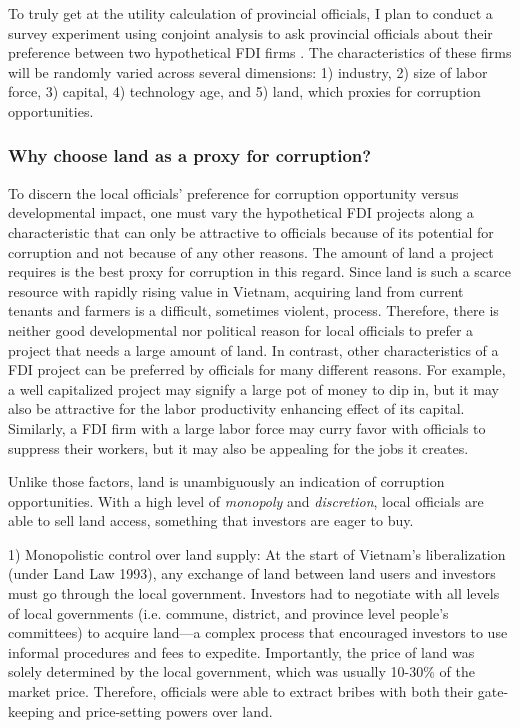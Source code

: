 To truly get at the utility calculation of provincial officials, I plan to conduct a survey experiment using conjoint analysis to ask provincial officials about their preference between two hypothetical FDI firms \citep{Hainmueller2014}. The characteristics of these firms will be randomly varied across several dimensions: 1) industry, 2) size of labor force, 3) capital, 4) technology age, and 5) land, which proxies for corruption opportunities.

\subsubsection{Why choose land as a proxy for corruption?}

To discern the local officials' preference for corruption opportunity versus developmental impact, one must vary the hypothetical FDI projects along a characteristic that can only be attractive to officials because of its potential for corruption and not because of any other reasons. The amount of land a project requires is the best proxy for corruption in this regard. Since land is such a scarce resource with rapidly rising value in Vietnam, acquiring land from current tenants and farmers is a difficult, sometimes violent, process. Therefore, there is neither good developmental nor political reason for local officials to prefer a project that needs a large amount of land. In contrast, other characteristics of a FDI project can be preferred by officials for many different reasons. For example, a well capitalized project may signify a large pot of money to dip in, but it may also be attractive for the labor productivity enhancing effect of its capital. Similarly, a FDI firm with a large labor force may curry favor with officials to suppress their workers, but it may also be appealing for the jobs it creates. 

Unlike those factors, land is unambiguously an indication of corruption opportunities. With a high level of \textit{monopoly} and \textit{discretion}, local officials are able to sell land access, something that investors are eager to buy.

1) Monopolistic control over land supply: At the start of Vietnam's liberalization (under Land Law 1993), any exchange of land between land users and investors must go through the local government. Investors had to negotiate with all levels of local governments (i.e. commune, district, and province level people's committees) to acquire land---a complex process that encouraged investors to use informal procedures and fees to expedite. Importantly, the price of land was solely determined by the local government, which was usually 10-30\% of the market price. Therefore, officials were able to extract bribes with both their gate-keeping and price-setting powers over land.

